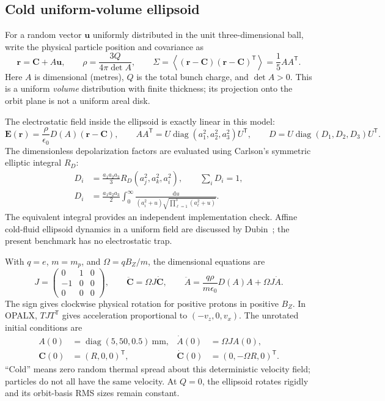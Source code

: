 \documentclass[10pt,a4paper]{article}
\newcommand{\T}{\mathsf T}
\newcommand{\dd}{\mathrm d}
\newcommand{\eps}{\epsilon_0}
\begin{document}
\clearpage
\subsection{Cold uniform-volume ellipsoid}
For a random vector $\bm u$ uniformly distributed in the unit three-dimensional
ball, write the physical particle position and covariance as
\begin{equation}
 \bm r=\bm C+A\bm u,\qquad
 \rho=\frac{3Q}{4\pi\det A},\qquad
 \Sigma=\left\langle(\bm r-\bm C)(\bm r-\bm C)^\T\right\rangle
       =\frac15 AA^\T .\label{eq:affine}
\end{equation}
Here $A$ is dimensional (metres), $Q$ is the total bunch charge, and
$\det A>0$. This is a uniform \emph{volume} distribution with finite thickness;
its projection onto the orbit plane is not a uniform areal disk.

The electrostatic field inside the ellipsoid is exactly linear in this model:
\begin{equation}
 \bm E(\bm r)=\frac{\rho}{\eps}D(A)(\bm r-\bm C),\qquad
 AA^\T=U\operatorname{diag}(a_1^2,a_2^2,a_3^2)U^\T,\qquad
 D=U\operatorname{diag}(D_1,D_2,D_3)U^\T .\label{eq:field}
\end{equation}
The dimensionless depolarization factors are evaluated using Carlson's
symmetric elliptic integral $R_D$:
\begin{align}
 D_i&=\frac{a_1a_2a_3}{3}R_D(a_j^2,a_k^2,a_i^2),\qquad \sum_iD_i=1,\label{eq:carlson}\\
 D_i&=\frac{a_1a_2a_3}{2}\int_0^\infty
 \frac{\dd u}{(a_i^2+u)\sqrt{\prod_{\ell=1}^{3}(a_\ell^2+u)}} .
\end{align}
The equivalent integral provides an independent implementation check.
Affine cold-fluid ellipsoid dynamics in a uniform field are discussed by
Dubin~\cite{dubin}; the present benchmark has no electrostatic trap.

With $q=e$, $m=m_p$, and $\Omega=qB_Z/m$, the dimensional equations are
\begin{equation}
 J=\begin{pmatrix}0&1&0\\-1&0&0\\0&0&0\end{pmatrix},\qquad
 \ddot{\bm C}=\Omega J\dot{\bm C},\qquad
 \ddot A=\frac{q\rho}{m\eps}D(A)A+\Omega J\dot A .\label{eq:model}
\end{equation}
The sign gives clockwise physical rotation for positive protons in positive
$B_Z$. In OPALX, $TJT^\T$ gives acceleration proportional to $(-v_z,0,v_x)$.
The unrotated initial conditions are
\begin{align}
 A(0)&=\operatorname{diag}(5,50,0.5)~\mathrm{mm},&
 \dot A(0)&=\Omega J A(0),\\
 \bm C(0)&=(R,0,0)^\T,&
 \dot{\bm C}(0)&=(0,-\Omega R,0)^\T .
\end{align}
``Cold'' means zero random thermal spread about this deterministic velocity
field; particles do not all have the same velocity. At $Q=0$, the ellipsoid
rotates rigidly and its orbit-basis RMS sizes remain constant.
\end{document}

